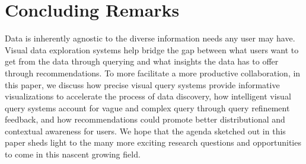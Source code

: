 \section{Concluding Remarks\label{sec:conclusion}}
\par Data is inherently agnostic to the diverse information needs any user may have. Visual data exploration systems help bridge the gap between what users want to get from the data through querying and what insights the data has to offer through recommendations. To more facilitate a more productive collaboration, in this paper, we discuss how precise visual query systems provide informative visualizations to accelerate the process of data discovery, how intelligent visual query systems account for vague and complex query through query refinement feedback, and how recommendations could promote better distributional and contextual awareness for users. We hope that the agenda sketched out in this paper sheds light to the many more exciting research questions and opportunities to come in this nascent growing field.%



